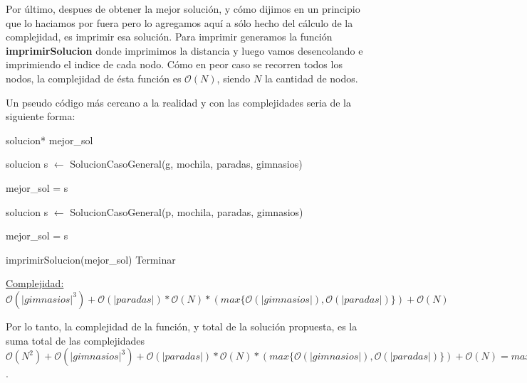 Por último, despues de obtener la mejor solución, y cómo dijimos en un principio que lo haciamos por fuera pero lo agregamos aquí a sólo hecho del cálculo de la complejidad, es imprimir esa solución. Para imprimir generamos la función \textbf{imprimirSolucion} donde imprimimos la distancia y luego vamos desencolando e imprimiendo el indice de cada nodo. Cómo en peor caso se recorren todos los nodos, la complejidad de ésta función es $\mathcal{O}(N)$, siendo $N$ la cantidad de nodos.

Un pseudo código más cercano a la realidad y con las complejidades seria de la siguiente forma:

\begin{algorithm}[H]
\label{}
\begin{algorithmic}[]

\State solucion* mejor\_sol 

 

	 

		\State solucion s $\leftarrow$ SolucionCasoGeneral(g, mochila, paradas, gimnasios) 

		 
			\State mejor\_sol = s 
		\EndIf
	
	\EndFor

\Else

	 

		\State solucion s $\leftarrow$ SolucionCasoGeneral(p, mochila, paradas, gimnasios) 

		 
			\State mejor\_sol = s 
		\EndIf

	\EndFor


\EndIf

\State imprimirSolucion(mejor\_sol) 
\State Terminar

\medskip
\Statex \underline{Complejidad: $\mathcal{O}(|gimnasios|^3) + \mathcal{O}(|paradas|) * \mathcal{O}(N) * (max\{\mathcal{O}(|gimnasios|), \mathcal{O}(|paradas|)\}) + \mathcal{O}(N)$}
\end{algorithmic}
\end{algorithm}

Por lo tanto, la complejidad de la función, y total de la solución propuesta, es la suma total de las complejidades $\mathcal{O}(N^2) + \mathcal{O}(|gimnasios|^3) + \mathcal{O}(|paradas|) * \mathcal{O}(N) * (max\{\mathcal{O}(|gimnasios|), \mathcal{O}(|paradas|)\}) + \mathcal{O}(N) = max\{\mathcal{O}(N^2), \mathcal{O}(|gimnasios|^3), \mathcal{O}(|paradas|) * \mathcal{O}(N) * (max\{\mathcal{O}(|gimnasios|), \mathcal{O}(|paradas|)\})\}$.





